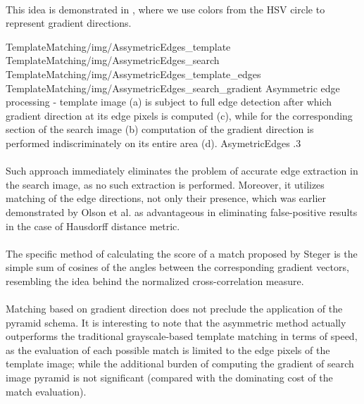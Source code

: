 \paragraph*{}
This idea is demonstrated in , where we use colors from the HSV circle to represent gradient directions.

\fourFigures
{TemplateMatching/img/AssymetricEdges_template}
{TemplateMatching/img/AssymetricEdges_search}
{TemplateMatching/img/AssymetricEdges_template_edges}
{TemplateMatching/img/AssymetricEdges_search_gradient}
{Asymmetric edge processing - template image (a) is subject to full edge detection after which gradient direction at its edge pixels is computed (c), while for the corresponding section of the search image (b) computation of the gradient direction is performed indiscriminately on its entire area (d).}
{AsymetricEdges}
{.3\textwidth}

\paragraph*{}
Such approach immediately eliminates the problem of accurate edge extraction in the search image, as no such extraction is performed. Moreover, it utilizes matching of the edge directions, not only their presence, which was earlier demonstrated\cite{Olson97} by Olson et al. as advantageous in eliminating false-positive results in the case of Hausdorff distance metric.

\paragraph*{}
The specific method of calculating the score of a match proposed by Steger is the simple sum of cosines of the angles between the corresponding gradient vectors, resembling the idea behind the normalized cross-correlation measure.

\paragraph*{}
Matching based on gradient direction does not preclude the application of the pyramid schema. It is interesting to note that the asymmetric method actually outperforms the traditional grayscale-based template matching in terms of speed, as the evaluation of each possible match is limited to the edge pixels of the template image; while the additional burden of computing the gradient of search image pyramid is not significant (compared with the dominating cost of the match evaluation).

